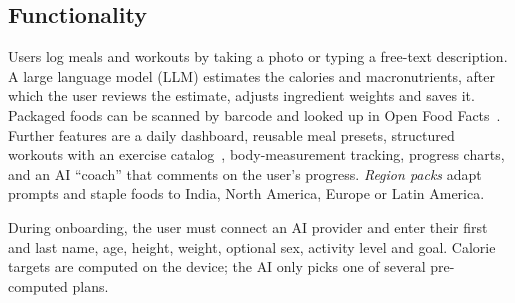 \documentclass[a4paper,12pt]{article}
\begin{document}
\subsection{Functionality}
Users log meals and workouts by taking a photo or typing a free-text description. A large
language model (LLM) estimates the calories and macronutrients, after which the user reviews the
estimate, adjusts ingredient weights and saves it. Packaged foods can be scanned by barcode and
looked up in Open Food Facts~\cite{off-api}. Further features are a daily dashboard, reusable
meal presets, structured workouts with an exercise catalog~\cite{exercisedb-repo},
body-measurement tracking, progress charts, and an AI ``coach'' that comments on the user's
progress. \emph{Region packs} adapt prompts and staple foods to India, North America, Europe or
Latin America.

During onboarding, the user must connect an AI provider and enter their first and last name,
age, height, weight, optional sex, activity level and goal. Calorie targets are computed on the
device; the AI only picks one of several pre-computed plans.
\end{document}
